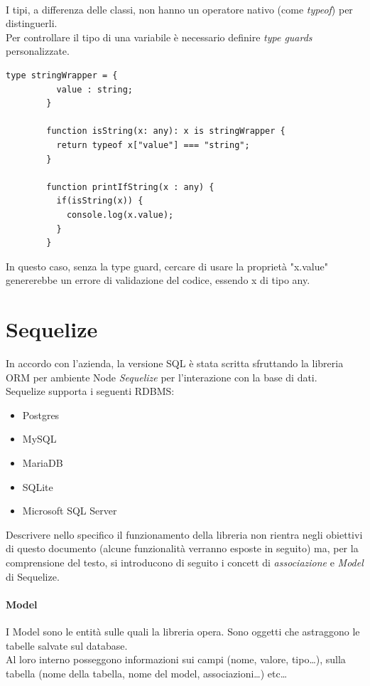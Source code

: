 \documentclass[a4paper, 12pt]{report}
\begin{document}
      \paragraph*{}
      I tipi, a differenza delle classi, non hanno un operatore nativo (come \emph{typeof}) per distinguerli.\\
      Per controllare il tipo di una variabile è necessario definire \emph{type guards} personalizzate.
      \begin{Verbatim}[samepage=true]
        type stringWrapper = {
          value : string;
        }

        function isString(x: any): x is stringWrapper {
          return typeof x["value"] === "string";
        }

        function printIfString(x : any) {
          if(isString(x)) {
            console.log(x.value);
          }
        }
      \end{Verbatim}
      In questo caso, senza la type guard, cercare di usare la proprietà "x.value" genererebbe un errore di validazione del codice, essendo x di tipo any.
    \newpage

    \section{Sequelize}
      In accordo con l'azienda, la versione SQL è stata scritta sfruttando la libreria ORM per ambiente Node \emph{Sequelize} per l'interazione con la base di dati.\\
      Sequelize supporta i seguenti RDBMS:
      \begin{itemize}
        \item Postgres
        \item MySQL
        \item MariaDB
        \item SQLite
        \item Microsoft SQL Server
      \end{itemize}
      
      Descrivere nello specifico il funzionamento della libreria non rientra negli obiettivi di questo documento (alcune funzionalità verranno esposte in seguito) ma, per la comprensione del testo, si introducono di seguito i concett di \emph{associazione}  e \emph{Model} di Sequelize.
      \paragraph*{Model} 
      I Model sono le entità sulle quali la libreria opera. Sono oggetti che astraggono le tabelle salvate sul database.\\
      Al loro interno posseggono informazioni sui campi (nome, valore, tipo\dots), sulla tabella (nome della tabella, nome del model, associazioni\dots) etc\dots
\end{document}
